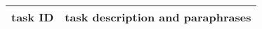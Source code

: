\documentclass{article}
\begin{document}
\begin{table*}[!tbh]
    \centering
    \begin{tabular}{cp{14cm}}
    \toprule
    task ID & { task description and paraphrases} \\
    \hline
         

\end{tabular}
\end{table*}
\end{document}
